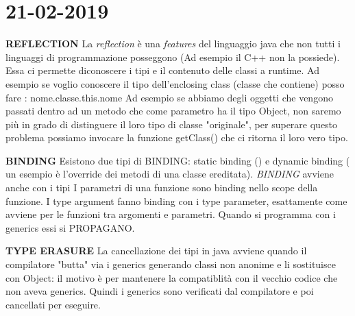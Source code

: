 

\newpage
\section{21-02-2019}
\textbf{REFLECTION} \newline
La \textit{reflection} è una \textit{features} del linguaggio java che non tutti i linguaggi di programmazione posseggono (Ad esempio il C++ non la possiede). Essa ci permette diconoscere i tipi e il contenuto delle classi  a runtime. Ad esempio se voglio conoscere il tipo dell'enclosing class (classe che contiene) posso fare : nome.classe.this.nome  \newline
Ad esempio se abbiamo degli oggetti che vengono passati dentro ad un metodo che come parametro ha il tipo Object, non saremo più in grado di distinguere il loro tipo di classe "originale", per superare questo problema possiamo invocare la funzione getClass() che ci ritorna il loro vero tipo.

\noindent \textbf{BINDING} \newline
Esistono due tipi di BINDING: static binding () e dynamic binding ( un esempio è l'override dei metodi di una classe ereditata).\newline
\textit{BINDING} avviene anche con i tipi \newline
I parametri di una funzione sono binding nello scope della funzione.\newline
I type argument fanno binding con i type parameter, esattamente come avviene per le funzioni tra argomenti e parametri. \newline
Quando si programma con i generics essi si PROPAGANO. 

\noindent \textbf{TYPE ERASURE} \newline
La cancellazione dei tipi in java avviene quando il compilatore "butta" via i generics generando classi non anonime e li sostituisce con Object: il motivo è per mantenere la compatiblità con il vecchio codice che non aveva generics. Quindi i generics sono verificati dal compilatore e poi cancellati per eseguire.














